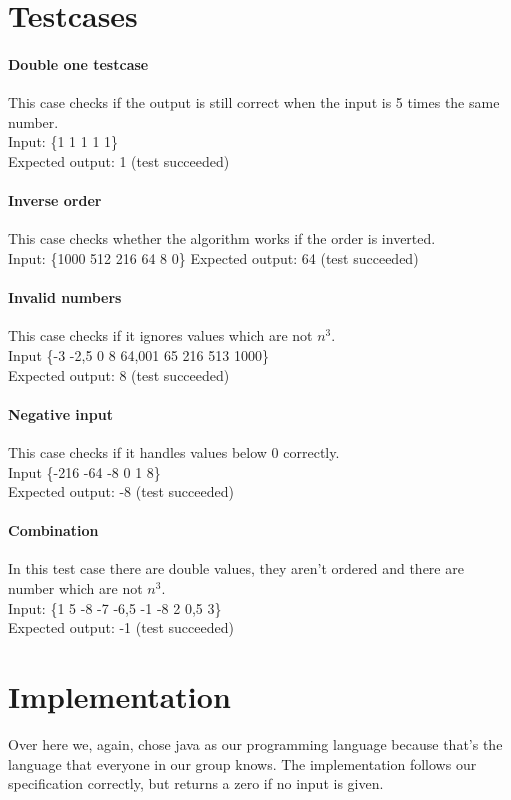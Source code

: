 \documentclass[12pt]{article}
\begin{document}
\section{Testcases}

\paragraph{Double one testcase}
This case checks if the output is still correct when the input is 5 times the same number. \\
Input: \{1 1 1 1 1\} \\
Expected output: 1 (test succeeded)

\paragraph{Inverse order}
This case checks whether the algorithm works if the order is inverted. \\
Input: \{1000 512 216 64 8 0\}
Expected output: 64 (test succeeded)

\paragraph{Invalid numbers}
This case checks if it ignores values which are not $n^3$. \\
Input \{-3 -2,5 0 8 64,001 65 216 513 1000\} \\
Expected output: 8 (test succeeded)

\paragraph{Negative input}
This case checks if it handles values below 0 correctly. \\
Input \{-216 -64 -8 0 1 8\} \\
Expected output: -8 (test succeeded)

\paragraph{Combination}
In this test case there are double values, they aren't ordered and there are number which are not $n^3$.\\
Input: \{1 5 -8 -7 -6,5 -1 -8 2 0,5 3\} \\
Expected output: -1 (test succeeded)

\section{Implementation}
Over here we, again, chose java as our programming language because that's the language that everyone in our group knows. The implementation follows our specification correctly, but returns a zero if no input is given.
\end{document}

